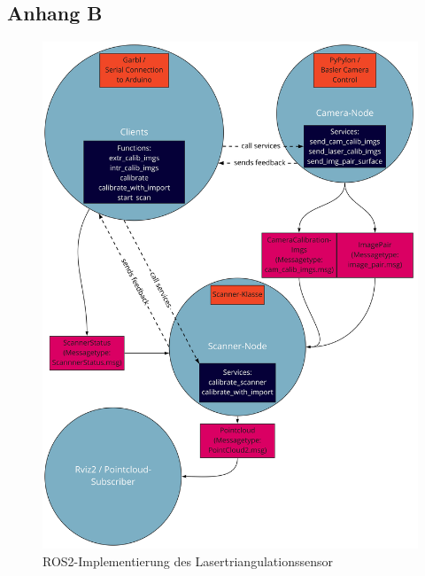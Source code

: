 \documentclass[	12pt,
				a4paper,
				bibliography=totoc,
				listof=totoc,
				index=totoc,
				twoside,
				headsepline,
				footsepline,
				ngerman]{scrartcl}
\begin{document}
\begin{appendix}
		\subsection{Anhang B}\label{anhang-b}
		\begin{figure}[h!]
			\centering
			\includegraphics[width=0.9\linewidth]{img/anhang/ROS2_implementation.jpg}
			\caption{ROS2-Implementierung des Lasertriangulationssensor}
			\label{fig:ros2_all}
		\end{figure}
		\newpage

\end{appendix}
\end{document}
